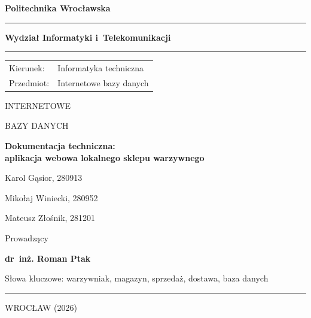 \documentclass[12pt,a4paper,oneside]{article}
\newcommand{\tytulpl}{Dokumentacja techniczna:\\[0.35em]
	aplikacja webowa lokalnego sklepu warzywnego}
\newcounter{pu}
\begin{document}
\hypersetup{pageanchor=false}
\thispagestyle{empty}
\begin{titlepage}
	\centering
	{\Large\bfseries Politechnika Wrocławska\par}
	\vspace{0.55em}
	\rule{\textwidth}{1.05pt}\par
	\vspace{0.7em}
	{\large\bfseries Wydział Informatyki i~Telekomunikacji\par}
	\vspace{0.45em}
	\rule{\textwidth}{0.55pt}\par

	\vspace{1.35cm}
	\begin{flushleft}
		\begin{tabular}{@{}p{3.1cm}l@{}}
			Kierunek:  & Informatyka techniczna \\[0.45em]
			Przedmiot: & Internetowe bazy danych \\
		\end{tabular}
	\end{flushleft}

	\vspace{1.9cm}
	{\LARGE INTERNETOWE\par}
	\vspace{0.15em}
	{\LARGE BAZY DANYCH\par}

	\vspace{1.7cm}
	{\Large\bfseries \tytulpl\par}

	\vspace{1.45cm}
	Karol Gąsior, 280913\par
	\vspace{0.2em}
	Mikołaj Winiecki, 280952\par
	\vspace{0.2em}
	Mateusz Złośnik, 281201\par

	\vspace{1.45cm}
	Prowadzący\par
	\vspace{0.25em}
	\textbf{dr~inż. Roman Ptak}\par

	\vfill
	\begin{flushleft}
		Słowa kluczowe: warzywniak, magazyn, sprzedaż, dostawa, baza danych
	\end{flushleft}
	\vspace{0.55cm}
	\rule{\textwidth}{0.7pt}\par
	\vspace{0.55em}
	WROCŁAW (2026)\par
	\vspace*{0.2cm}
\end{titlepage}
\hypersetup{pageanchor=true}
\end{document}
